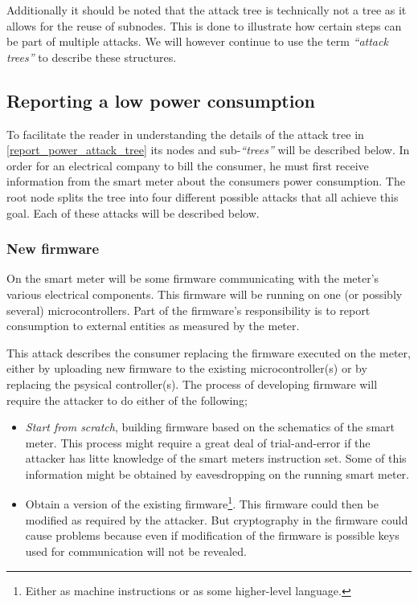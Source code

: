 Additionally it should be noted that the attack tree is technically not a tree as it allows for the reuse of subnodes.
This is done to illustrate how certain steps can be part of multiple attacks.
We will however continue to use the term \emph{``attack trees''} to describe these structures.

\subsection{Reporting a low power consumption}
To facilitate the reader in understanding the details of the attack tree in \cref{report_power_attack_tree} its nodes and sub-\emph{``trees''} will be described below.
In order for an electrical company to bill the consumer, he must first receive information from the smart meter about the consumers power consumption.
The root node splits the tree into four different possible attacks that all achieve this goal.
Each of these attacks will be described below.

\subsubsection{New firmware}
On the smart meter will be some firmware communicating with the meter's various electrical components.
This firmware will be running on one (or possibly several) microcontrollers.
Part of the firmware's responsibility is to report consumption to external entities as measured by the meter.

This attack describes the consumer replacing the firmware executed on the meter, either by uploading new firmware to the existing microcontroller(s) or by replacing the psysical controller(s).
The process of developing firmware will require the attacker to do either of the following;
\begin{itemize}
  \item \emph{Start from scratch}, building firmware based on the schematics of the smart meter.
  This process might require a great deal of trial-and-error if the attacker has litte knowledge of the smart meters instruction set.
  Some of this information might be obtained by eavesdropping on the running smart meter.
  \item Obtain a version of the existing firmware\footnote{Either as machine instructions or as some higher-level language.}.
    This firmware could then be modified as required by the attacker.
    But cryptography in the firmware could cause problems because even if modification of the firmware is possible keys used for communication will not be revealed.
\end{itemize}

